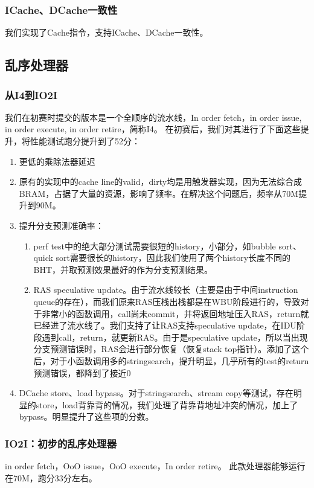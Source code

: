 \documentclass[lang=cn,11pt,a4paper]{elegantpaper}
\begin{document}
\subsubsection{ICache、DCache一致性}
我们实现了Cache指令，支持ICache、DCache一致性。

\subsection{乱序处理器}
\subsubsection{从I4到IO2I}
我们在初赛时提交的版本是一个全顺序的流水线，In order fetch，in order issue, in order execute, in order retire，简称I4。
在初赛后，我们对其进行了下面这些提升，将性能测试跑分提升到了52分：
\begin{enumerate}

\item 更低的乘除法器延迟
\item 原有的实现中的cache line的valid，dirty均是用触发器实现，因为无法综合成BRAM，占据了大量的资源，影响了频率。在解决这个问题后，频率从70M提升到90M。
\item 提升分支预测准确率：
\begin{enumerate}
	\item perf test中的绝大部分测试需要很短的history，小部分，如bubble sort、quick sort需要很长的history，因此我们使用了两个history长度不同的BHT，并取预测效果最好的作为分支预测结果。
	
	\item RAS speculative update。由于流水线较长（主要是由于中间instruction
	queue的存在），而我们原来RAS压栈出栈都是在WBU阶段进行的，导致对于非常小的函数调用，call尚未commit，并将返回地址压入RAS，return就已经进了流水线了。我们支持了让RAS支持speculative update，在IDU阶段遇到call，return，就更新RAS。由于是speculative update，所以当出现分支预测错误时，RAS会进行部分恢复（恢复stack top指针）。添加了这个后，对于小函数调用多的stringsearch，提升明显，几乎所有的test的return预测错误，都降到了接近0%
\end{enumerate}

\item DCache store、load bypass。对于stringsearch、stream copy等测试，存在明显的store，load背靠背的情况，我们处理了背靠背地址冲突的情况，加上了bypass。明显提升了这些项的分数。
\end{enumerate}


\subsubsection{IO2I：初步的乱序处理器}
in order fetch，OoO issue，OoO execute，In order retire。
此款处理器能够运行在70M，跑分33分左右。
\end{document}
